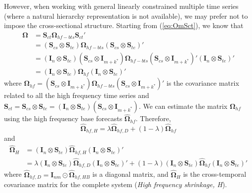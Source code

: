 \documentclass[a4paper,11pt]{article}
\newcommand{\Ivet}{\bm{I}}
\newcommand{\Svet}{\bm{S}}
\newcommand{\Omegavet}{\bm{\Omega}}
\theoremstyle{definition}
\begin{document}
However, when working with general linearly constrained multiple time series (where a natural hierarchy representation is not available), we may prefer not to impose the cross-sectional structure. Starting from (\ref{eq:OmSct}), we know that
\begin{align*}
	\Omegavet & = \Svet_{ct}\Omegavet_{hf-bts}\Svet_{ct}'\\
	 & = \left(\Svet_{cs} \otimes \Svet_{te}\right)\Omegavet_{hf-bts}\left(\Svet_{cs} \otimes \Svet_{te}\right)'\\
	 & = \left(\Ivet_n \otimes \Svet_{te}\right)\left(\Svet_{cs} \otimes \Ivet_{m+k^\ast}\right)\Omegavet_{hf-bts}\left(\Svet_{cs} \otimes \Ivet_{m+k^\ast}\right)'\left(\Ivet_n \otimes \Svet_{te}\right)'\\
	 & = \left(\Ivet_n \otimes \Svet_{te}\right)\Omegavet_{hf}\left(\Ivet_n \otimes \Svet_{te}\right)'
\end{align*}
where $\Omegavet_{hf} = \left(\Svet_{cs} \otimes \Ivet_{m+k^\ast}\right)\Omegavet_{hf-bts}\left(\Svet_{cs} \otimes \Ivet_{m+k^\ast}\right)'$ is the covariance matrix related to all the high frequency time series and $\Svet_{ct} = \Svet_{cs} \otimes \Svet_{te} = \left(\Ivet_n \otimes \Svet_{te}\right)\left(\Svet_{cs} \otimes \Ivet_{m+k^\ast}\right)$. We can estimate the matrix $\Omegavet_{hf}$ using the high frequency base forecasts $\widehat{\Omegavet}_{hf}$. Therefore,
$$
\widehat{\Omegavet}_{hf, H} = \lambda \widehat{\Omegavet}_{hf, D} + (1-\lambda) \widehat{\Omegavet}_{hf}
$$
and
\begin{align*}
	\widehat{\Omegavet}_{H} & = (\Ivet_{n} \otimes \Svet_{te})\widehat{\Omegavet}_{hf, H} (\Ivet_{n} \otimes \Svet_{te})'\\
	& = \lambda (\Ivet_{n} \otimes \Svet_{te})\widehat{\Omegavet}_{hf, D}(\Ivet_{n} \otimes \Svet_{te})' + (1-\lambda) (\Ivet_{n} \otimes \Svet_{te})\widehat{\Omegavet}_{hf}(\Ivet_{n} \otimes \Svet_{te})'
\end{align*}
where $\widehat{\Omegavet}_{hf, D} = \Ivet_{nm}\odot\widehat{\Omegavet}_{hf, HB}$ is a diagonal matrix, and $\widehat{\Omegavet}_{H}$ is the cross-temporal covariance matrix for the complete system (\textit{High frequency shrinkage, H}).
\end{document}
